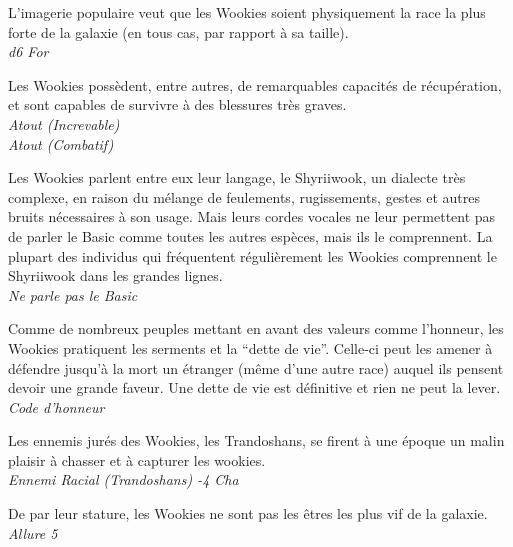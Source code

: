 \begin{description}[align=left]
	\item [Force de la nature] 				%
		L’imagerie populaire veut que les Wookies soient physiquement la race la plus forte de la galaxie (en tous cas, par rapport à sa taille).\\
		\textit{d6 For}

	\item [Increvable] 						%
		Les Wookies possèdent, entre autres, de remarquables capacités de récupération, et sont capables de survivre à des blessures très graves.\\
		\textit{Atout (Increvable)}\\
		\textit{Atout (Combatif)}

	\item [Shyriiwook] 						%
		Les Wookies parlent entre eux leur langage, le Shyriiwook, un dialecte très complexe, en raison du mélange de feulements, rugissements, gestes et autres bruits nécessaires à son usage. Mais leurs cordes vocales ne leur permettent pas de parler le Basic comme toutes les autres espèces, mais ils le comprennent. La plupart des individus qui fréquentent régulièrement les Wookies comprennent le Shyriiwook dans les grandes lignes.\\
		\textit{Ne parle pas le Basic}

	\item [Force \& Honneur] 				%
		Comme de nombreux peuples mettant en avant des valeurs comme l’honneur, les Wookies pratiquent les serments et la “dette de vie”. Celle-ci peut les amener à défendre jusqu’à la mort un étranger (même d’une autre race) auquel ils pensent devoir une grande faveur. Une dette de vie est définitive et rien ne peut la lever.\\
		\textit{Code d’honneur}

	\item [Ennemis jurés] 					%
		Les ennemis jurés des Wookies, les Trandoshans, se firent à une époque un malin plaisir à chasser et à capturer les wookies.\\
		\textit{Ennemi Racial (Trandoshans) -4 Cha}

	\item [Il faut partir à point] 			%
		De par leur stature, les Wookies ne sont pas les êtres les plus vif de la galaxie.\\
		\textit{Allure 5}
\end{description}